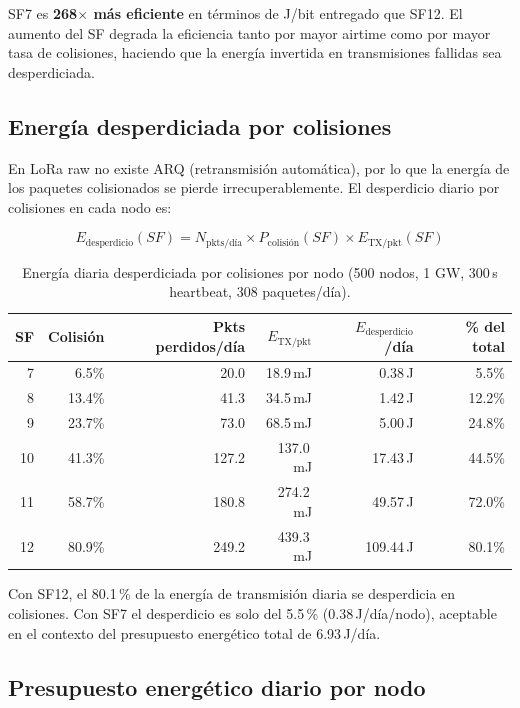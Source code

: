 \documentclass[12pt,letterpaper]{article}
\begin{document}
SF7 es \textbf{268$\times$ más eficiente} en términos de J/bit entregado
que SF12. El aumento del SF degrada la eficiencia tanto por mayor airtime
como por mayor tasa de colisiones, haciendo que la energía invertida en
transmisiones fallidas sea desperdiciada.

\subsection{Energía desperdiciada por colisiones}

En LoRa raw no existe ARQ (retransmisión automática), por lo que la
energía de los paquetes colisionados se pierde irrecuperablemente.
El desperdicio diario por colisiones en cada nodo es:

\begin{equation}
  E_\text{desperdicio}(SF) = N_\text{pkts/día} \times P_\text{colisión}(SF)
    \times E_\text{TX/pkt}(SF)
\end{equation}

\begin{table}[H]
\centering
\caption{Energía diaria desperdiciada por colisiones por nodo
  (500 nodos, 1 GW, 300\,s heartbeat, 308 paquetes/día).}
\label{tab:wasted_energy}
\begin{tabular}{rrrrrr}
\toprule
\textbf{SF} & \textbf{Colisión} & \textbf{Pkts perdidos/día} &
  \textbf{$E_\text{TX/pkt}$} & \textbf{$E_\text{desperdicio}$/día} &
  \textbf{\% del total} \\
\midrule
 7 &  6.5\% &  20.0 &  18.9\,mJ &   0.38\,J &  5.5\% \\
 8 & 13.4\% &  41.3 &  34.5\,mJ &   1.42\,J & 12.2\% \\
 9 & 23.7\% &  73.0 &  68.5\,mJ &   5.00\,J & 24.8\% \\
10 & 41.3\% & 127.2 & 137.0\,mJ &  17.43\,J & 44.5\% \\
11 & 58.7\% & 180.8 & 274.2\,mJ &  49.57\,J & 72.0\% \\
12 & 80.9\% & 249.2 & 439.3\,mJ & 109.44\,J & 80.1\% \\
\bottomrule
\end{tabular}
\end{table}

Con SF12, el 80.1\,\% de la energía de transmisión diaria se desperdicia
en colisiones. Con SF7 el desperdicio es solo del 5.5\,\%
(0.38\,J/día/nodo), aceptable en el contexto del presupuesto energético
total de 6.93\,J/día.

\subsection{Presupuesto energético diario por nodo}
\end{document}
